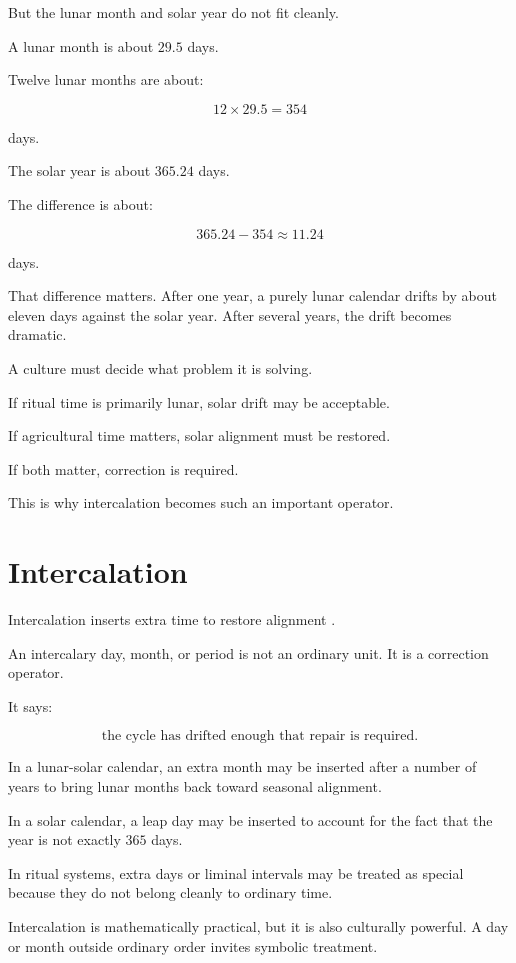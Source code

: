 \documentclass[11pt]{book}
\begin{document}
But the lunar month and solar year do not fit cleanly.

A lunar month is about \(29.5\) days.

Twelve lunar months are about:

\[
12 \times 29.5 = 354
\]

days.

The solar year is about \(365.24\) days.

The difference is about:

\[
365.24 - 354 \approx 11.24
\]

days.

That difference matters. After one year, a purely lunar calendar drifts by about eleven days against the solar year. After several years, the drift becomes dramatic.

A culture must decide what problem it is solving.

If ritual time is primarily lunar, solar drift may be acceptable.

If agricultural time matters, solar alignment must be restored.

If both matter, correction is required.

This is why intercalation becomes such an important operator.

\section{Intercalation}

Intercalation inserts extra time to restore alignment \cite{Parker1950CalendarsEgypt,Aveni1989EmpiresTime,Needham1959ScienceCivilisationChina3}.

An intercalary day, month, or period is not an ordinary unit. It is a correction operator.

It says:

\[
\text{the cycle has drifted enough that repair is required}.
\]

In a lunar-solar calendar, an extra month may be inserted after a number of years to bring lunar months back toward seasonal alignment.

In a solar calendar, a leap day may be inserted to account for the fact that the year is not exactly \(365\) days.

In ritual systems, extra days or liminal intervals may be treated as special because they do not belong cleanly to ordinary time.

Intercalation is mathematically practical, but it is also culturally powerful. A day or month outside ordinary order invites symbolic treatment.
\end{document}
